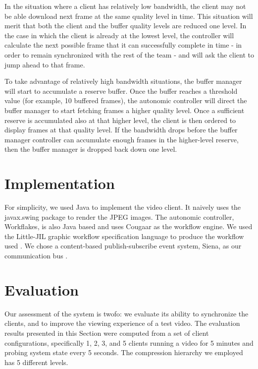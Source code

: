 \documentclass{sig-alternate}
\begin{document}
In the situation where a client has relatively low bandwidth, the
client may not be able download next frame at the same quality level
in time.  This situation will merit that both the client and the
buffer quality levels are reduced one level. In the case in which the
client is already at the lowest level, the controller will calculate
the next possible frame that it can successfully complete in time - in
order to remain synchronized with the rest of the team - and will ask
the client to jump ahead to that frame.

To take advantage of relatively high bandwidth situations, the buffer
manager will start to accumulate a reserve buffer.  Once the buffer
reaches a threshold value (for example, 10 buffered frames), the
autonomic controller will direct the buffer manager to start fetching
frames a higher quality level.  Once a sufficient reserve is
accumulated also at that higher level, the client is then ordered to
display frames at that quality level.  If the bandwidth drops before
the buffer manager controller can accumulate enough frames in the
higher-level reserve, then the buffer manager is dropped back down one
level.

\section{Implementation} \label{implementation}

For simplicity, we used Java to implement the video client.  It
naively uses the javax.swing package to render the JPEG images.  The
autonomic controller, Workflakes, is also Java based and uses Cougaar
\cite{Cougaar} as the workflow engine.  We used the Little-JIL graphic
workflow specification language to produce the workflow used
\cite{L-JIL}.  We chose a content-based publish-subscribe event
system, Siena, as our communication bus \cite{SIENA}.

\section{Evaluation} \label{eval}

Our assessment of the system is twofo: we evaluate its ability to synchronize the
clients, and to improve the viewing experience of a test video.
The evaluation results presented in this Section were computed from a set of client
configurations, specifically 1, 2, 3, and 5 clients running a video
for 5 minutes and probing system state every 5 seconds. The compression hierarchy we employed 
has 5 different levels.
\end{document}
